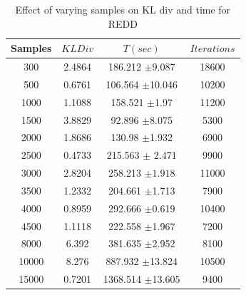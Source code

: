 \documentclass[conference]{IEEEtran}
\begin{document}

\begin{table}[htdp]
\begin{center}
\begin{tabular}{| c | c | c | c |}
\hline
Samples & $KL Div$ & $T(sec)$ & $Iterations$ \\
\hline
300 & 2.4864 & 186.212 $\pm$9.087 & 18600 \\
500 & 0.6761 & 106.564 $\pm$10.046 & 10200 \\
1000 & 1.1088 & 158.521 $\pm$1.97  & 11200 \\
1500 & 3.8829 & 92.896 $\pm$8.075  & 5300 \\
2000 & 1.8686 & 130.98 $\pm$1.932 & 6900 \\
2500 & 0.4733 & 215.563 $\pm$ 2.471 & 9900 \\
3000 & 2.8204 & 258.213 $\pm1.918$ & 11000 \\
3500 & 1.2332 & 204.661 $\pm$1.713 & 7900 \\
4000 & 0.8959 & 292.666 $\pm$0.619 & 10400  \\
4500 & 1.1118 & 222.558 $\pm$1.967 & 7200  \\
8000 & 6.392 & 381.635 $\pm$2.952 & 8100  \\
10000 & 8.276 & 887.932 $\pm$13.824 & 10500  \\
15000 & 0.7201 & 1368.514 $\pm$13.605 & 9400  \\
\hline
\end{tabular}
\end{center}
\caption{Effect of varying samples on KL div and time for REDD}
\label{table:sample1}
\end{table}
\end{document}
